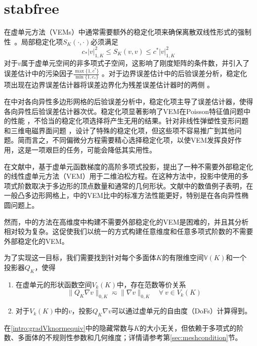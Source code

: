 
\section{stabfree}
在虚单元方法（VEMs）中通常需要额外的稳定化项来确保离散双线性形式的强制性~\cite{BeiraoBrezziCangianiManziniEtAl2013,BeiraoBrezziMariniRusso2014}。局部稳定化项$S_K(\cdot, \cdot)$必须满足
$$
c_{*} |v|_{1,K}^2\leq S_K(v,v)\leq c^{*} |v|_{1,K}^2
$$
对于$v$属于虚单元空间的非多项式子空间，这影响了刚度矩阵的条件数，并引入了误差估计中的污染因子$\frac{\max\{1, c^*\}}{\min\{1, c_*\}}$ \cite{DassiMascotto2018,BeiraodaVeigaDassiRusso2017,Mascotto2018}。对于边界误差估计中的后验误差分析，稳定化项出现在边界误差估计器将误差边界化为残差误差估计器时的两侧 \cite{CangianiGeorgoulisPryerSutton2017}。

在\cite{AntoniettiBerroneBorioDAuriaEtAl2022}中对各向异性多边形网格的后验误差分析中，稳定化项主导了误差估计器，使得各向异性后验误差估计器次优。稳定化项显著影响了VEM在Poisson特征值问题中的性能 \cite{BoffiGardiniGastaldi2020}，不恰当的稳定化项选择将产生无用的结果。针对非线性弹塑性变形问题 \cite{HudobivnikAldakheelWriggers2019} 和三维电磁界面问题 \cite{CaoChenGuo2023}，设计了特殊的稳定化项，但这些项不容易推广到其他问题。简而言之，不同偏微分方程需要精心选择稳定化项，以使VEM发挥良好作用，这是一项艰巨的任务，可能会降低其实用性。

在文献\cite{BerroneBorioMarcon2021}中，基于虚单元函数梯度的高阶多项式投影，提出了一种不需要外部稳定化的线性虚单元方法（VEM）用于二维泊松方程。在这种方法中，投影中使用的多项式阶数取决于多边形的顶点数量和通常的几何形状。文献\cite{BerroneBorioMarcon2022}中的数值例子表明，在一般凸多边形网格上，\cite{BerroneBorioMarcon2021}中的VEM比\cite{BeiraodaVeigaBrezziMariniRusso2016}中的标准方法性能更好，特别是在各向异性椭圆问题上。

然而，\cite{BerroneBorioMarcon2021}中的方法在高维度中构建不需要外部稳定化的VEM是困难的，并且其分析相对较为复杂。这促使我们以统一的方式构建任意维度和任意多项式阶数的不需要外部稳定化的VEM。

为了实现这一目标，我们需要找到针对每个多面体$K$的有限维空间$\mathbb{V}(K)$和一个投影器$Q_K$，使得
\begin{enumerate}[(C1)]
    \item 在虚单元的形状函数空间$V_k(K)$中，存在范数等价关系
    \begin{equation}\label{intro:gradVknormequiv}
    \|Q_{K}\nabla v\|_{0,K}\eqsim \|\nabla v\|_{0,K} \quad \forall~v\in V_k(K)
    \end{equation}
    \item 对于$V_k(K)$中的$v$，投影$Q_{K}\nabla v$可以通过虚单元的自由度（DoFs）计算得到。
\end{enumerate}
在\eqref{intro:gradVknormequiv}中的隐藏常数与$K$的大小无关，但依赖于多项式的阶数、多面体的不规则性参数和几何维度；详情请参考第\ref{sec:meshcondition}节。


